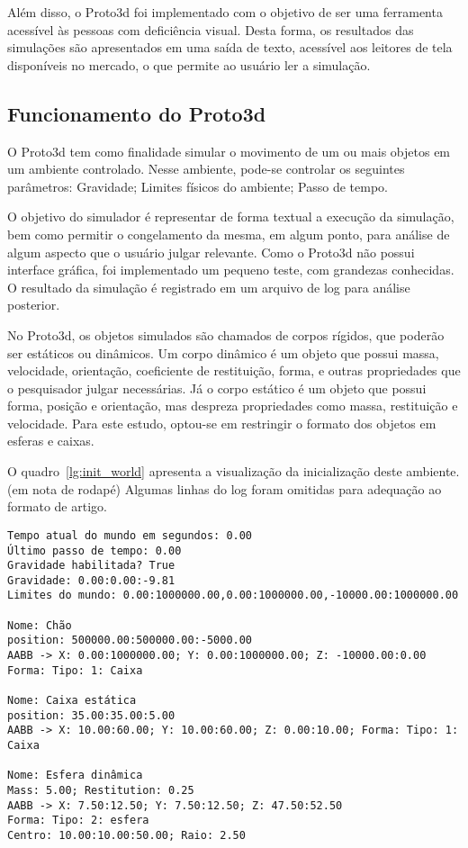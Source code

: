 \documentclass[12pt]{article}
\begin{document}
Além disso, o Proto3d foi implementado com o objetivo de ser uma ferramenta acessível às pessoas com deficiência visual. Desta forma, os resultados das simulações são apresentados em uma saída de texto, acessível aos leitores de tela disponíveis no mercado, o que permite ao usuário ler a simulação.

\subsection {Funcionamento do Proto3d}
O Proto3d tem como finalidade simular o movimento de um ou mais objetos em um ambiente controlado. Nesse ambiente, pode-se controlar os seguintes parâmetros: Gravidade; Limites físicos do ambiente; Passo de tempo.

O objetivo do simulador é representar de forma textual a execução da simulação, bem como permitir o congelamento da mesma, em algum ponto, para análise de algum aspecto que o usuário julgar relevante. Como o Proto3d não possui interface gráfica, foi implementado um pequeno teste, com grandezas conhecidas. O resultado da simulação é registrado em um arquivo de log para análise posterior.

No Proto3d, os objetos simulados são chamados de corpos rígidos, que poderão ser estáticos ou dinâmicos. Um corpo dinâmico é um objeto que possui massa, velocidade, orientação, coeficiente de restituição, forma, e outras propriedades que o pesquisador julgar necessárias. Já o corpo estático é um objeto que possui forma, posição e orientação, mas despreza propriedades como massa, restituição e velocidade. Para este estudo, optou-se em restringir o formato dos objetos em esferas e caixas.

O quadro~\ref{lg:init_world} apresenta a visualização da inicialização deste ambiente. (em nota de rodapé) Algumas linhas do log foram omitidas para adequação ao formato de artigo.

\begin{lstlisting}[frame=single,caption=Inicialização do ambiente\label{lg:init_world}]
Tempo atual do mundo em segundos: 0.00
Último passo de tempo: 0.00
Gravidade habilitada? True
Gravidade: 0.00:0.00:-9.81
Limites do mundo: 0.00:1000000.00,0.00:1000000.00,-10000.00:1000000.00

Nome: Chão
position: 500000.00:500000.00:-5000.00
AABB -> X: 0.00:1000000.00; Y: 0.00:1000000.00; Z: -10000.00:0.00 Forma: Tipo: 1: Caixa

Nome: Caixa estática
position: 35.00:35.00:5.00
AABB -> X: 10.00:60.00; Y: 10.00:60.00; Z: 0.00:10.00; Forma: Tipo: 1: Caixa

Nome: Esfera dinâmica
Mass: 5.00; Restitution: 0.25
AABB -> X: 7.50:12.50; Y: 7.50:12.50; Z: 47.50:52.50
Forma: Tipo: 2: esfera
Centro: 10.00:10.00:50.00; Raio: 2.50
\end{lstlisting}
\end{document}
